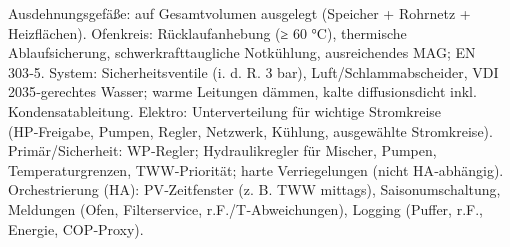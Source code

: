 \markdownRendererUlItem Ausdehnungsgefäße: auf Gesamtvolumen ausgelegt (Speicher + Rohrnetz + Heizflächen).\markdownRendererUlItemEnd 
\markdownRendererUlEndTight \markdownRendererInterblockSeparator
{}
\markdownRendererSectionEnd \markdownRendererSectionBegin
{}\markdownRendererInterblockSeparator
{}\markdownRendererUlBeginTight
\markdownRendererUlItem Ofenkreis: Rücklaufanhebung (≥ 60 °C), thermische Ablaufsicherung, schwerkrafttaugliche Notkühlung, ausreichendes MAG; EN 303‑5.\markdownRendererUlItemEnd 
\markdownRendererUlItem System: Sicherheitsventile (i. d. R. 3 bar), Luft/Schlammabscheider, VDI 2035‑gerechtes Wasser; warme Leitungen dämmen, kalte diffusionsdicht inkl. Kondensatableitung.\markdownRendererUlItemEnd 
\markdownRendererUlItem Elektro: Unterverteilung für wichtige Stromkreise (HP‑Freigabe, Pumpen, Regler, Netzwerk, Kühlung, ausgewählte Stromkreise).\markdownRendererUlItemEnd 
\markdownRendererUlEndTight \markdownRendererInterblockSeparator
{}
\markdownRendererSectionEnd \markdownRendererSectionBegin
{}\markdownRendererInterblockSeparator
{}\markdownRendererUlBeginTight
\markdownRendererUlItem Primär/Sicherheit: WP‑Regler; Hydraulikregler für Mischer, Pumpen, Temperaturgrenzen, TWW‑Priorität; harte Verriegelungen (nicht HA‑abhängig).\markdownRendererUlItemEnd 
\markdownRendererUlItem Orchestrierung (HA): PV‑Zeitfenster (z. B. TWW mittags), Saisonumschaltung, Meldungen (Ofen, Filterservice, r.F./T‑Abweichungen), Logging (Puffer, r.F., Energie, COP‑Proxy).\markdownRendererUlItemEnd 
\markdownRendererUlEndTight 
\markdownRendererSectionEnd 
\markdownRendererSectionEnd \markdownRendererDocumentEnd